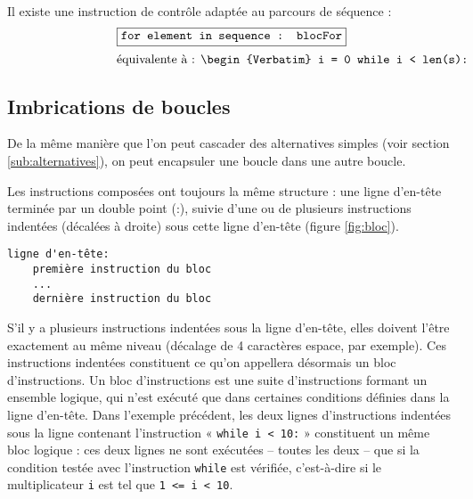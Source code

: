 \noindent Il existe une instruction de contrôle adaptée au parcours de séquence :
$$\fbox{\tt for element in sequence : blocFor}$$
$$\begin{minipage}{6.5cm}équivalente à : 
\begin{minipage}[t]{4cm}
\begin{Verbatim}
i = 0
while i < len(s):
    element = sequence[i]
    blocFor
    i = i + 1
\end{Verbatim}
\end{minipage}
\end{minipage}$$

\subsection{Imbrications de boucles}
De la même manière que l'on peut cascader des alternatives simples
(voir section \ref{sub:alternatives}), on peut encapsuler une boucle 
dans une autre boucle.


Les instructions composées ont toujours la même structure : 
une ligne d'en-tête terminée par un double point ({:}), suivie
d'une ou de plusieurs instructions indentées (décalées à droite)
sous cette ligne d'en-tête (figure \ref{fig:bloc}).

\begin{minipage}[t]{5cm}
\begin{Verbatim}
ligne d'en-tête:
    première instruction du bloc
    ...
    dernière instruction du bloc
\end{Verbatim}
\end{minipage}

\noindent S'il y a plusieurs instructions indentées sous la ligne d'en-tête, elles doivent l'être exactement au
même niveau (décalage de 4 caractères espace, par exemple). Ces instructions indentées
constituent ce qu'on appellera désormais un bloc d'instructions. Un bloc d'instructions est une
suite d'instructions formant un ensemble logique, qui n'est exécuté que dans certaines conditions
définies dans la ligne d'en-tête. Dans l'exemple précédent, les deux lignes
d'instructions indentées sous la ligne contenant l'instruction « {\tt while i < 10:} » constituent un même 
bloc logique : ces deux lignes ne sont exécutées -- toutes les deux -- que si la condition testée 
avec l'instruction {\tt while} est vérifiée, c'est-à-dire si le multiplicateur {\tt i}
est tel que {\tt 1 <= i < 10}.


